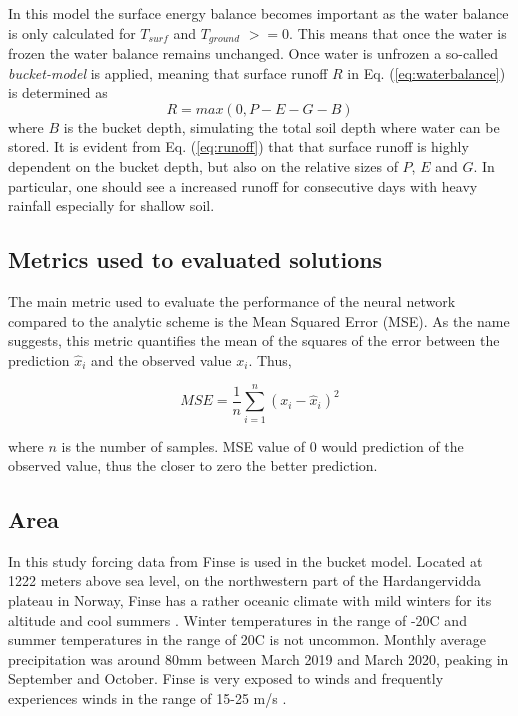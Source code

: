 \documentclass[a4paper,11pt,twocolumn]{article}
\begin{document}
In this model the surface energy balance becomes important as the water balance is only calculated for $T_{surf}$ and $T_{ground}$ $>=0$. This means that once the water is frozen the water balance remains unchanged. Once water is unfrozen a so-called \textit{bucket-model} is applied, meaning that surface runoff $R$ in Eq. (\ref{eq:waterbalance}) is determined as
\begin{equation}
	R = max(0, P-E-G-B)
	\label{eq:runoff}
\end{equation}  
where $B$ is the bucket depth, simulating the total soil depth where water can be stored. It is evident from Eq. (\ref{eq:runoff}) that that surface runoff is highly dependent on the bucket depth, but also on the relative sizes of $P$, $E$ and $G$. In particular, one should see a increased runoff for consecutive days with heavy rainfall especially for shallow soil.  

\subsection{Metrics used to evaluated solutions}

The main metric used to evaluate the performance of the neural network compared to the analytic scheme is the Mean Squared Error (MSE). As the name suggests, this metric quantifies the mean of the squares of the error between the prediction $\hat{x}_i$ and the observed value $x_i$. Thus, 

\begin{equation*}
MSE = \frac{1}{n}\sum_{i=1}^n (x_i - \hat{x}_i)^2
\end{equation*}

where $n$ is the number of samples. MSE value of 0 would prediction of the observed value, thus the closer to zero the better prediction.  

\subsection{Area}
In this study forcing data from Finse is used in the bucket model. Located at 1222 meters above sea level, on the northwestern part of the Hardangervidda plateau in Norway, Finse has a rather oceanic climate with mild winters for its altitude and cool summers \cite{finse}. Winter temperatures in the range of -20\textdegree C and summer temperatures in the range of 20\textdegree C is not uncommon. Monthly average precipitation was around 80mm between March 2019 and March 2020, peaking in September and October. Finse is very exposed to winds and frequently experiences winds in the range of 15-25 m/s \cite{yr}. 
\end{document}
